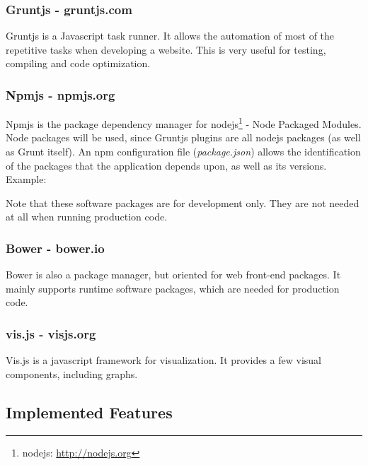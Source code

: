     \subsubsection{Gruntjs - gruntjs.com} %
      \label{ssub:gruntjs}
        Gruntjs is a Javascript task runner.
        It allows the automation of most of the repetitive tasks when developing a website.
        This is very useful for testing, compiling and code optimization.

    \subsubsection{Npmjs - npmjs.org} %
    \label{ssub:npm}
      Npmjs is the package dependency manager for nodejs\footnote{nodejs: \url{http://nodejs.org}} - Node Packaged Modules.
      Node packages will be used, since Gruntjs plugins are all nodejs packages (as well as Grunt itself).
      An npm configuration file (\emph{package.json}) allows the identification of the packages that the application depends upon, as well as its versions.
      Example: 

      

      Note that these software packages are for development only. They are not needed at all when running production code.

    \subsubsection{Bower - bower.io} %
    \label{ssub:bower}
    
    Bower is also a package manager, but oriented for web front-end packages.
    It mainly supports runtime software packages, which are needed for production code.


    \subsubsection{vis.js - visjs.org} %
    \label{ssub:visjs}
      Vis.js is a javascript framework for visualization.
      It provides a few visual components, including graphs.


  \subsection{Implemented Features} %
    \label{sub:main_features}
    
